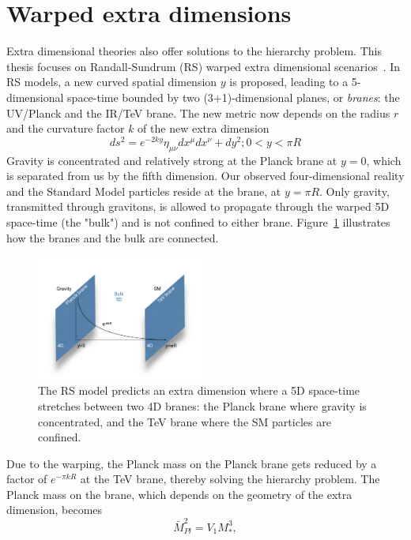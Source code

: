 \section{Warped extra dimensions}
\label{sec:theory:wed}
Extra dimensional theories also offer solutions to the hierarchy problem. This thesis focuses on Randall-Sundrum (RS) warped extra dimensional scenarios~\cite{PhysRevLett.83.3370}. In RS models, a new curved spatial dimension $y$ is proposed, leading to a 5-dimensional space-time bounded by two (3+1)-dimensional planes, or \emph{branes}: the UV/Planck and the IR/TeV brane. The new metric now depends on the radius $r$ and the curvature factor $k$ of the new extra dimension
\begin{equation}
  ds^2=e^{-2ky}\eta_{\mu\nu}dx^{\mu}dx^{\nu}+dy^2; 0 < y < \pi R
\end{equation}
Gravity is concentrated and relatively strong at the Planck brane at $y=0$, which is separated from us by the fifth dimension. Our observed four-dimensional reality and the Standard Model particles reside at the \TeV brane, at $y=\pi R$. Only gravity, transmitted through gravitons, is allowed to propagate through the warped 5D space-time (the "bulk") and is not confined to either brane. Figure~\ref{fig:theory:rs1} illustrates how the branes and the bulk are connected.
\begin{figure}[h!]
\centering
\includegraphics[width=0.49\textwidth]{figures/theory/rs1.pdf}
\caption{The RS model predicts an extra dimension where a 5D space-time stretches between two 4D branes: the Planck brane where gravity is concentrated, and the TeV brane where the SM particles are confined.}
\label{fig:theory:rs1}
\end{figure}
 Due to the warping, the Planck mass on the Planck brane gets reduced by a factor of $e^{-\pi kR}$ at the TeV brane, thereby solving the hierarchy problem. The Planck mass on the \TeV brane, which depends on the geometry of the extra dimension, becomes
\begin{equation}
  \bar{M}_{Pl}^2=V_1M_*^3,
  \end{equation} 
